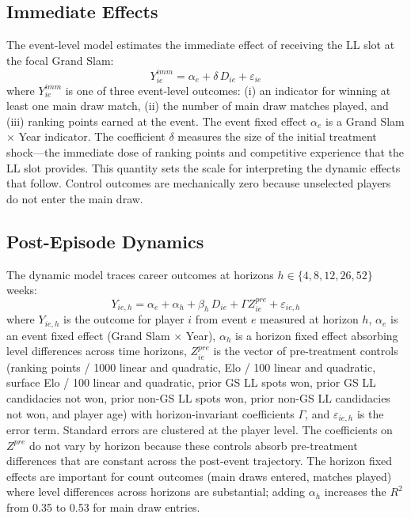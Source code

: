 \subsection{Immediate Effects}
\label{sec:strategy_immediate}

The event-level model estimates the immediate effect of receiving the LL slot at the focal Grand Slam:
\begin{equation}
\label{eq:immediate}
Y^{imm}_{ie} = \alpha_e + \delta \, D_{ie} + \varepsilon_{ie}
\end{equation}
where $Y^{imm}_{ie}$ is one of three event-level outcomes: (i) an indicator for winning at least one main draw match, (ii) the number of main draw matches played, and (iii) ranking points earned at the event. The event fixed effect $\alpha_e$ is a Grand Slam $\times$ Year indicator. The coefficient $\delta$ measures the size of the initial treatment shock---the immediate dose of ranking points and competitive experience that the LL slot provides. This quantity sets the scale for interpreting the dynamic effects that follow. Control outcomes are mechanically zero because unselected players do not enter the main draw.

\subsection{Post-Episode Dynamics}
\label{sec:strategy_dynamics}

The dynamic model traces career outcomes at horizons $h \in \{4, 8, 12, 26, 52\}$ weeks:
\begin{equation}
\label{eq:dynamics}
Y_{ie,h} = \alpha_e + \alpha_h + \beta_h \, D_{ie} + \Gamma Z^{pre}_{ie} + \varepsilon_{ie,h}
\end{equation}
where $Y_{ie,h}$ is the outcome for player $i$ from event $e$ measured at horizon $h$, $\alpha_e$ is an event fixed effect (Grand Slam $\times$ Year), $\alpha_h$ is a horizon fixed effect absorbing level differences across time horizons, $Z^{pre}_{ie}$ is the vector of pre-treatment controls (ranking points / 1000 linear and quadratic, Elo / 100 linear and quadratic, surface Elo / 100 linear and quadratic, prior GS LL spots won, prior GS LL candidacies not won, prior non-GS LL spots won, prior non-GS LL candidacies not won, and player age) with horizon-invariant coefficients $\Gamma$, and $\varepsilon_{ie,h}$ is the error term. Standard errors are clustered at the player level. The coefficients on $Z^{pre}$ do not vary by horizon because these controls absorb pre-treatment differences that are constant across the post-event trajectory. The horizon fixed effects are important for count outcomes (main draws entered, matches played) where level differences across horizons are substantial; adding $\alpha_h$ increases the $R^2$ from 0.35 to 0.53 for main draw entries.

